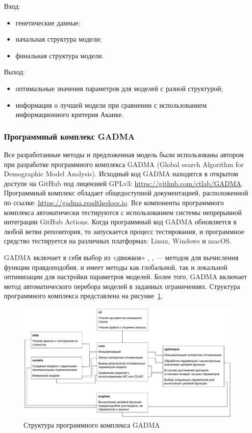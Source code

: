 \documentclass[a4paper,14pt,oneside,openany,article]{memoir}
\begin{document}
Вход:
\begin{itemize}
    \item генетические данные;
    \item начальная структура модели;
    \item финальная структура модели.
\end{itemize}

Выход:
\begin{itemize}
    \item оптимальные значения параметров для моделей с разной структурой;
    \item информация о лучшей модели при сравнении с использованием информационного критерия Акаике.
\end{itemize}


\subsubsection*{Программный комплекс GADMA}

Все разработанные методы и предложенная модель были использованы автором при разработке программного комплекса GADMA (Global search Algorithm for Demographic Model Analysis).
Исходный код GADMA находится в открытом доступе на GitHub под лицензией GPLv3: \url{https://github.com/ctlab/GADMA}.
Программный комплекс обладает общедоступной документацией, расположенной по ссылке: \url{https://gadma.readthedocs.io}.
Все компоненты программного комплекса автоматически тестируются с использованием системы непрерывной интеграции GitHub Actions.
Когда программный код GADMA обновляется в любой ветви репозитория, то запускается процесс тестирования, и программное средство тестируется на различных платформах: Linux, Windows и macOS.

GADMA включает в себя выбор из «движков» \dadi, \moments, \momi --- методов для вычисления функции правдоподобия, и имеет методы как глобальной, так и локальной оптимизации для настройки параметров моделей.
Более того, GADMA включает метод автоматического перебора моделей в заданных ограничениях.
Структура программного комплекса представлена на рисунке~\ref{fig:syn_ru:gadma_modules}.

\begin{figure}[h]
    \centering
    \includegraphics[width=\linewidth]{images/part5/gadma_modules.pdf}
    \caption{Структура программного комплекса GADMA}
    \label{fig:syn_ru:gadma_modules}
\end{figure}
\end{document}
